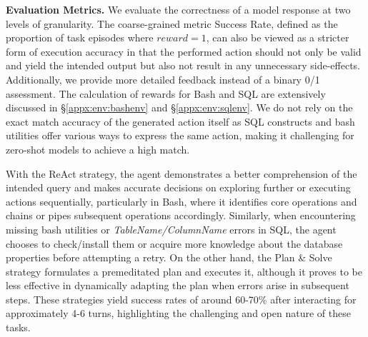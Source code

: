 \textbf{Evaluation Metrics.} We evaluate the correctness of a model response at two levels of granularity. The coarse-grained metric Success Rate, defined as the proportion of task episodes where $reward = 1$, can also be viewed as a stricter form of execution accuracy in that the performed action should not only be valid and yield the intended output but also not result in any unnecessary side-effects. Additionally, we provide more detailed feedback instead of a binary 0/1 assessment. The calculation of rewards for Bash and SQL are extensively discussed in \S\ref{appx:env:bashenv} and \S\ref{appx:env:sqlenv}.
We do not rely on the exact match accuracy of the generated action itself as SQL constructs and bash utilities offer various ways to express the same action, making it challenging for zero-shot models to achieve a high match.

With the ReAct strategy, the agent demonstrates a better comprehension of the intended query and makes accurate decisions on exploring further or executing actions sequentially, particularly in Bash, where it identifies core operations and chains or pipes subsequent operations accordingly. Similarly, when encountering missing bash utilities or \textit{TableName/ColumnName} errors in SQL, the agent chooses to check/install them or acquire more knowledge about the database properties before attempting a retry. On the other hand, the Plan \& Solve strategy formulates a premeditated plan and executes it, although it proves to be less effective in dynamically adapting the plan when errors arise in subsequent steps. These strategies yield success rates of around 60-70\% after interacting for approximately 4-6 turns, highlighting the challenging and open nature of these tasks.